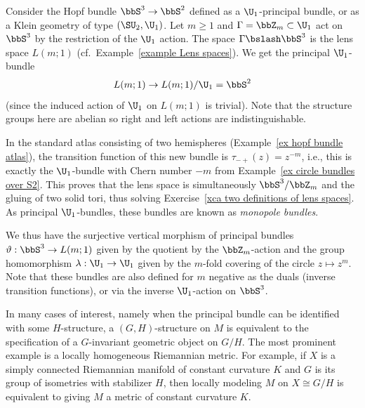 \begin{example}\label{ex monopole bundles}
    Consider the Hopf bundle $\bbS^3\to \bbS^2$ defined as a $\U_1$-principal bundle, or as a Klein geometry of type $(\SU_2,\U_1)$. Let $m\geq 1$ and $\Gamma=\bbZ_m\subset \U_1$ act on $\bbS^3$ by the restriction of the $\U_1$ action. The space $\Gamma\bslash \bbS^3$ is the lens space $L(m;1)$ (cf.\ Example~\ref{example Lens spaces}). We get the principal $\U_1$-bundle
    \[L(m;1)\to L(m;1)\slash \U_1=\bbS^2\]
    (since the induced action of $\U_1$ on $L(m;1)$ is trivial).
    Note that the structure groups here are abelian so right and left actions are indistinguishable.
    
    In the standard atlas consisting of two hemispheres (Example~\ref{ex hopf bundle atlas}), the transition function of this new bundle is $\tau_{-+}(z)=z^{-m}$, i.e., this is exactly the $\U_1$-bundle with Chern number $-m$ from Example~\ref{ex circle bundles over S2}. This proves that the lens space is simultaneously $\bbS^3\slash \bbZ_m$ and the gluing of two solid tori, thus solving Exercise~\ref{xca two definitions of lens spaces}. As principal $\U_1$-bundles, these bundles are known as \emph{monopole bundles}.

    We thus have the surjective vertical morphism of principal bundles $\vartheta:\bbS^3\to L(m;1)$ given by the quotient by the $\bbZ_m$-action and the group homomorphism $\lambda:\U_1\to \U_1$ given by the $m$-fold covering of the circle $z\mapsto z^m$. Note that these bundles are also defined for $m$ negative as the duals (inverse transition functions), or via the inverse $\U_1$-action on $\bbS^3$.
\end{example}

\begin{example}
    In many cases of interest, namely when the principal bundle can be identified with some $H$-structure, a $(G,H)$-structure on $M$ is equivalent to the specification of a $G$-invariant geometric object on $G\slash H$. The most prominent example is a locally homogeneous Riemannian metric. For example, if $X$ is a simply connected Riemannian manifold of constant curvature $K$ and $G$ is its group of isometries with stabilizer $H$, then locally modeling $M$ on $X\cong G\slash H$ is equivalent to giving $M$ a metric of constant curvature $K$.
\end{example}







